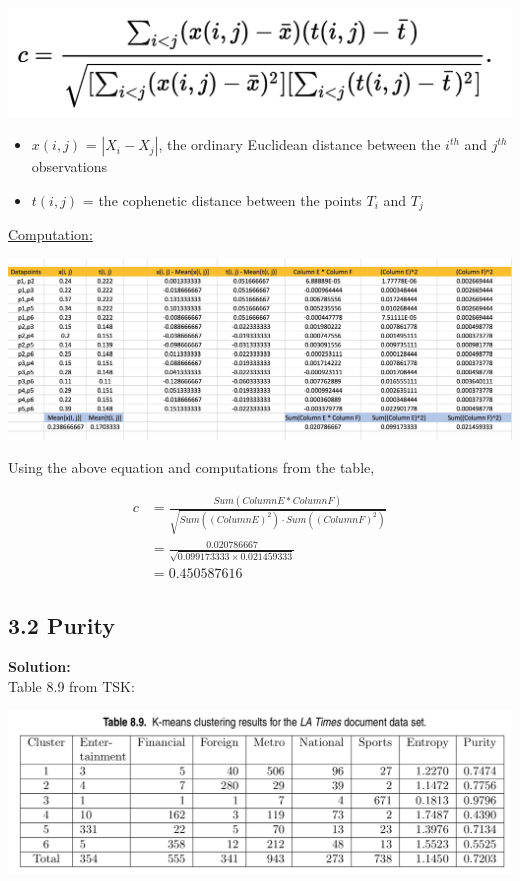 \documentclass[11pt]{article}
\begin{document}
\begin{center}
	\includegraphics[scale=0.2]{cophenetic_equation.jpeg}
\end{center}

\begin{itemize}
	\item $x(i, j)$ = $| X_i - X_j |$, the ordinary Euclidean distance between the $i^{th}$ and $j^{th}$ observations
	\item $t(i, j)$ = the cophenetic distance between the points $T_i$ and $T_j$
\end{itemize}

\underline{Computation:}
\begin{center}
	\includegraphics[scale=0.2]{cophenetic_excel}
\end{center}

Using the above equation and computations from the table,

\begin{align*}
	c &= \frac{Sum(Column E * Column F)}{\sqrt{Sum((Column E)^2) \cdot Sum((Column F)^2)}} \\
	&= \frac{0.020786667}{\sqrt{0.099173333 \times 0.021459333}} \\
	&= 0.450587616
\end{align*}


\subsection*{3.2 Purity}
\textbf{Solution:}\\

Table 8.9 from TSK: \\
\begin{center}
	\includegraphics[scale=0.2]{table_8_9.jpeg}
\end{center}
\end{document}

